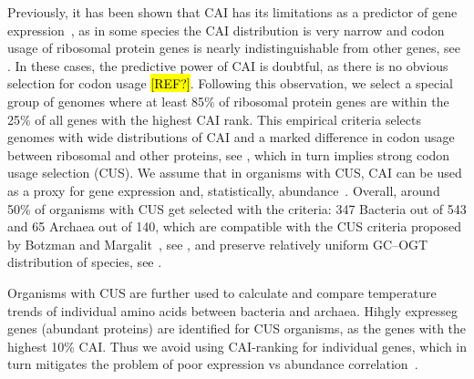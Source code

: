 \documentclass[10pt,letterpaper]{article}
\begin{document}
Previously, it has been shown that CAI has its limitations as a predictor of gene expression~\cite{Botzman2011Variation}, as in some species the CAI distribution is very narrow and codon usage of ribosomal protein genes is nearly indistinguishable from other genes, see . In these cases, the predictive power of CAI is doubtful, as there is no obvious selection for codon usage \hl{[REF?]}. Following this observation, we select a special group of genomes where at least 85\% of ribosomal protein genes are within the 25\% of all genes with the highest CAI rank. This empirical criteria selects genomes with wide distributions of CAI and a marked difference in codon usage between ribosomal and other proteins, see , which in turn implies strong codon usage selection (CUS). We assume that in organisms with CUS, CAI can be used as a proxy for gene expression and, statistically, abundance~\cite{Sharp1987The,Jansen2003Revisiting,Supek2005Comparison,Maier2009Correlation}. Overall, around 50\% of organisms with CUS get selected with the criteria: 347 Bacteria out of 543 and 65 Archaea out of 140, which are compatible with the CUS criteria proposed by Botzman and Margalit~\cite{Botzman2011Variation}, see , and preserve relatively uniform GC--OGT distribution of species, see .

Organisms with CUS are further used to calculate and compare temperature trends of individual amino acids between bacteria and archaea. Hihgly expresseg genes (abundant proteins) are identified for CUS organisms, as the genes with the highest 10\% CAI. Thus we avoid using CAI-ranking for individual genes, which in turn mitigates the problem of poor expression vs abundance correlation~\cite{Maier2009Correlation}.




\end{document}
